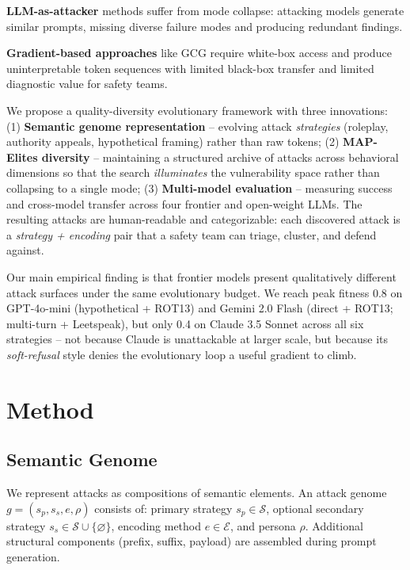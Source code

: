 \documentclass{article}
\begin{document}
\textbf{LLM-as-attacker} methods \citep{perez2022red,chao2023jailbreaking} suffer from mode collapse: attacking models generate similar prompts, missing diverse failure modes and producing redundant findings.

\textbf{Gradient-based approaches} like GCG \citep{zou2023universal} require white-box access and produce uninterpretable token sequences with limited black-box transfer and limited diagnostic value for safety teams.

We propose a quality-diversity evolutionary framework with three innovations: (1) \textbf{Semantic genome representation} -- evolving attack \emph{strategies} (roleplay, authority appeals, hypothetical framing) rather than raw tokens; (2) \textbf{MAP-Elites diversity} -- maintaining a structured archive of attacks across behavioral dimensions so that the search \emph{illuminates} the vulnerability space rather than collapsing to a single mode; (3) \textbf{Multi-model evaluation} -- measuring success and cross-model transfer across four frontier and open-weight LLMs. The resulting attacks are human-readable and categorizable: each discovered attack is a \emph{strategy + encoding} pair that a safety team can triage, cluster, and defend against.

Our main empirical finding is that frontier models present qualitatively different attack surfaces under the same evolutionary budget. We reach peak fitness 0.8 on GPT-4o-mini (hypothetical + ROT13) and Gemini 2.0 Flash (direct + ROT13; multi-turn + Leetspeak), but only 0.4 on Claude 3.5 Sonnet across all six strategies -- not because Claude is unattackable at larger scale, but because its \emph{soft-refusal} style denies the evolutionary loop a useful gradient to climb.

\section{Method}

\subsection{Semantic Genome}

We represent attacks as compositions of semantic elements. An attack genome $g = (s_p, s_s, e, \rho)$ consists of: primary strategy $s_p \in \mathcal{S}$, optional secondary strategy $s_s \in \mathcal{S} \cup \{\varnothing\}$, encoding method $e \in \mathcal{E}$, and persona $\rho$. Additional structural components (prefix, suffix, payload) are assembled during prompt generation.
\end{document}
